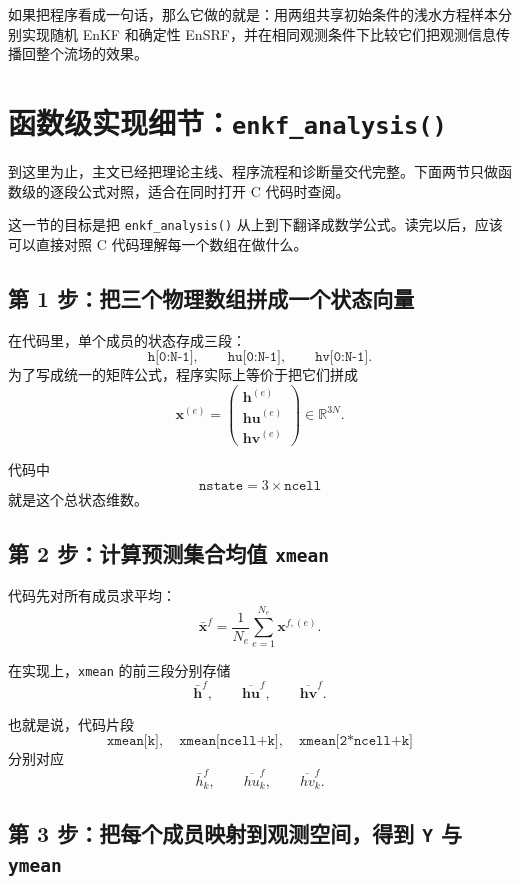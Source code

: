 \documentclass[12pt,a4paper]{article}
\begin{document}
如果把程序看成一句话，那么它做的就是：用两组共享初始条件的浅水方程样本分别实现随机 EnKF 和确定性 EnSRF，并在相同观测条件下比较它们把观测信息传播回整个流场的效果。

\appendix

\section{函数级实现细节：\texttt{enkf\_analysis()}}

到这里为止，主文已经把理论主线、程序流程和诊断量交代完整。下面两节只做函数级的逐段公式对照，适合在同时打开 C 代码时查阅。

这一节的目标是把 \texttt{enkf\_analysis()} 从上到下翻译成数学公式。读完以后，应该可以直接对照 C 代码理解每一个数组在做什么。

\subsection{第 1 步：把三个物理数组拼成一个状态向量}

在代码里，单个成员的状态存成三段：
\[
\texttt{h[0:N-1]},\qquad \texttt{hu[0:N-1]},\qquad \texttt{hv[0:N-1]}.
\]
为了写成统一的矩阵公式，程序实际上等价于把它们拼成
\[
\mathbf{x}^{(e)} =
\begin{pmatrix}
\mathbf{h}^{(e)} \\
\mathbf{hu}^{(e)} \\
\mathbf{hv}^{(e)}
\end{pmatrix}
\in \mathbb{R}^{3N}.
\]

代码中
\[
\texttt{nstate} = 3\times \texttt{ncell}
\]
就是这个总状态维数。

\subsection{第 2 步：计算预测集合均值 \texttt{xmean}}

代码先对所有成员求平均：
\[
\bar{\mathbf{x}}^f
= \frac{1}{N_e}\sum_{e=1}^{N_e}\mathbf{x}^{f,(e)}.
\]

在实现上，\texttt{xmean} 的前三段分别存储
\[
\bar{\mathbf{h}}^f,\qquad \overline{\mathbf{hu}}^f,\qquad \overline{\mathbf{hv}}^f.
\]

也就是说，代码片段
\[
\texttt{xmean[k]},\quad
\texttt{xmean[ncell+k]},\quad
\texttt{xmean[2*ncell+k]}
\]
分别对应
\[
\bar h_k^f,\qquad \overline{hu}_k^f,\qquad \overline{hv}_k^f.
\]

\subsection{第 3 步：把每个成员映射到观测空间，得到 \texttt{Y} 与 \texttt{ymean}}
\end{document}
